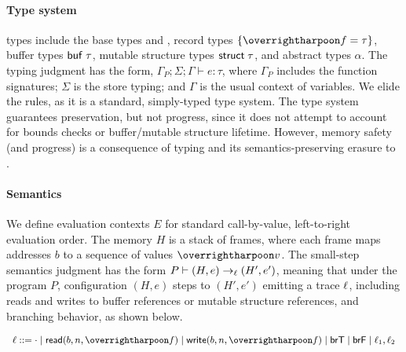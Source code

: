\paragraph{Type system} \lamstar types include the base
types  and , record types $\{\ls{\fd=\tau}\}$, buffer
types $\text{\textsf{buf}}\;\tau$, mutable structure types $\text{\textsf{struct}}\;\tau$, and abstract types $\alpha$.  The typing
judgment has the form, $\Gamma_P; \Sigma; \Gamma \vdash e : \tau$,
where $\Gamma_P$ includes the function signatures; $\Sigma$ is the
store typing; and $\Gamma$ is the usual context of variables. We elide
the rules, as it is a standard, simply-typed type system. The type
system guarantees preservation, but not progress, since it does not
attempt to account for bounds checks or buffer/mutable structure lifetime. However,
memory safety (and progress) is a consequence of \lowstar typing
and its semantics-preserving erasure to \lamstar.

\paragraph{Semantics} We define evaluation contexts $E$
for standard call-by-value, left-to-right evaluation order. The memory
$H$ is a stack of frames, where each frame maps addresses $b$ to a
sequence of values $\ls{v}$. The \lamstar small-step semantics
judgment has the form $P \vdash (H, e) \rightarrow_{\ell}
(H', e')$, meaning that under the program $P$, configuration $(H,
e)$ steps to $(H', e')$ emitting a trace $\ell$, including
reads and writes to buffer references or mutable structure references, and branching behavior, as
shown below.

\vspace{-0.5cm}
\[
\small
\begin{array}{rl}
\trace ::= \cdot \mid \kw{read}(b, n, \ls{\fd}) \mid \kw{write}(b,
n, \ls{\fd}) \mid \kw{brT} \mid \kw{brF} \mid \trace_1, \trace_2
\end{array}
\]

